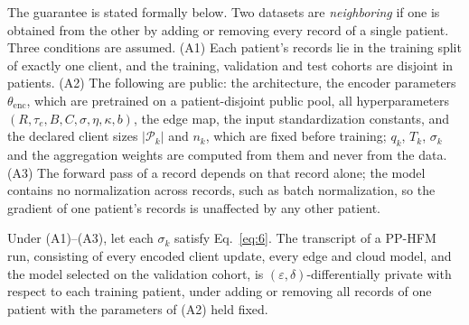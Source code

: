 The guarantee is stated formally below. Two datasets are \emph{neighboring} if
one is obtained from the other by adding or removing every record of a single
patient. Three conditions are assumed. (A1) Each patient's records lie in the
training split of exactly one client, and the training, validation and test
cohorts are disjoint in patients. (A2) The following are public: the
architecture, the encoder parameters $\theta_{\mathrm{enc}}$, which are
pretrained on a patient-disjoint public pool, all hyperparameters
$(R,\tau_e,B,C,\sigma,\eta,\kappa,b)$, the edge map, the input standardization constants, and the declared client
sizes $|\mathcal{P}_k|$ and $n_k$, which are fixed before training; $q_k$,
$T_k$, $\sigma_k$ and the aggregation weights are computed from them and never
from the data.
(A3) The forward pass of a record depends on that record alone; the model
contains no normalization across records, such as batch normalization, so the
gradient of one patient's records is unaffected by any other patient.

\begin{theorem}
\label{thm:guarantee}
Under (A1)--(A3), let each $\sigma_k$ satisfy Eq.~\eqref{eq:6}. The transcript of a
PP-HFM run, consisting of every encoded client update, every edge and cloud
model, and the model selected on the validation cohort, is
$(\varepsilon,\delta)$-differentially private with respect to
each training patient, under adding or removing all records of one patient
with the parameters of (A2) held fixed.
\end{theorem}

